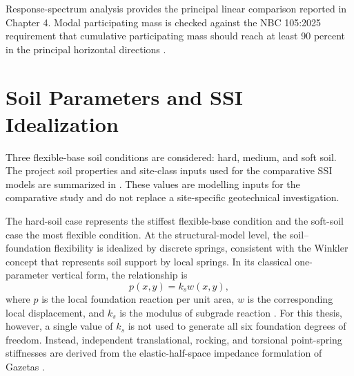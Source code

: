 Response-spectrum analysis provides the principal linear comparison reported in Chapter 4. Modal participating mass is checked against the NBC 105:2025 requirement that cumulative participating mass should reach at least 90 percent in the principal horizontal directions \cite{nbc1052025}.

\section{Soil Parameters and SSI Idealization}
Three flexible-base soil conditions are considered: hard, medium, and soft soil. The project soil properties and site-class inputs used for the comparative SSI models are summarized in . These values are modelling inputs for the comparative study and do not replace a site-specific geotechnical investigation.

\begin{table}[htbp]
\caption{Soil parameters and site classifications used for SSI modelling}
\label{tab:soil_parameters_methodology}
\centering
{}
\end{table}

The hard-soil case represents the stiffest flexible-base condition and the soft-soil case the most flexible condition. At the structural-model level, the soil--foundation flexibility is idealized by discrete springs, consistent with the Winkler concept that represents soil support by local springs. In its classical one-parameter vertical form, the relationship is
\begin{equation}
    p(x,y)=k_s w(x,y),
    \label{eq:winkler_relation}
\end{equation}
where $p$ is the local foundation reaction per unit area, $w$ is the corresponding local displacement, and $k_s$ is the modulus of subgrade reaction \cite{krishnan2024}. For this thesis, however, a single value of $k_s$ is not used to generate all six foundation degrees of freedom. Instead, independent translational, rocking, and torsional point-spring stiffnesses are derived from the elastic-half-space impedance formulation of Gazetas \cite{gazetas1991}.

